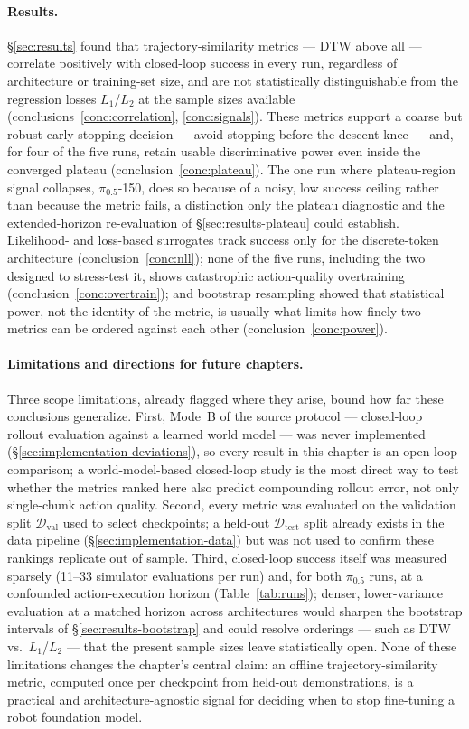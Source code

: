 \documentclass[11pt]{article}
\numberwithin{equation}{section}
\numberwithin{table}{section}
\numberwithin{figure}{section}
\begin{document}
\paragraph{Results.} \S\ref{sec:results} found that trajectory-similarity metrics --- DTW above all ---
correlate positively with closed-loop success in every run, regardless of architecture or training-set
size, and are not statistically distinguishable from the regression losses $L_1$/$L_2$ at the sample
sizes available (conclusions~\ref{conc:correlation}, \ref{conc:signals}). These metrics support a coarse
but robust early-stopping decision --- avoid stopping before the descent knee --- and, for four of the
five runs, retain usable discriminative power even inside the converged plateau
(conclusion~\ref{conc:plateau}). The one run where plateau-region signal collapses, $\pi_{0.5}$-150, does
so because of a noisy, low success ceiling rather than because the metric fails, a distinction only the
plateau diagnostic and the extended-horizon re-evaluation of \S\ref{sec:results-plateau} could establish.
Likelihood- and loss-based surrogates track success only for the discrete-token architecture
(conclusion~\ref{conc:nll}); none of the five runs, including the two designed to stress-test it, shows
catastrophic action-quality overtraining (conclusion~\ref{conc:overtrain}); and bootstrap resampling
showed that statistical power, not the identity of the metric, is usually what limits how finely two
metrics can be ordered against each other (conclusion~\ref{conc:power}).

\paragraph{Limitations and directions for future chapters.} Three scope limitations, already flagged
where they arise, bound how far these conclusions generalize. First, Mode~B of the source protocol ---
closed-loop rollout evaluation against a learned world model --- was never implemented
(\S\ref{sec:implementation-deviations}), so every result in this chapter is an open-loop comparison; a
world-model-based closed-loop study is the most direct way to test whether the metrics ranked here also
predict compounding rollout error, not only single-chunk action quality. Second, every metric was
evaluated on the validation split $\mathcal D_{\mathrm{val}}$ used to select checkpoints; a held-out
$\mathcal D_{\mathrm{test}}$ split already exists in the data pipeline (\S\ref{sec:implementation-data})
but was not used to confirm these rankings replicate out of sample. Third, closed-loop success itself was
measured sparsely (11--33 simulator evaluations per run) and, for both $\pi_{0.5}$ runs, at a confounded
action-execution horizon (Table~\ref{tab:runs}); denser, lower-variance evaluation at a matched horizon
across architectures would sharpen the bootstrap intervals of \S\ref{sec:results-bootstrap} and could
resolve orderings --- such as DTW vs.\ $L_1$/$L_2$ --- that the present sample sizes leave statistically
open. None of these limitations changes the chapter's central claim: an offline trajectory-similarity
metric, computed once per checkpoint from held-out demonstrations, is a practical and
architecture-agnostic signal for deciding when to stop fine-tuning a robot foundation model.
\end{document}
